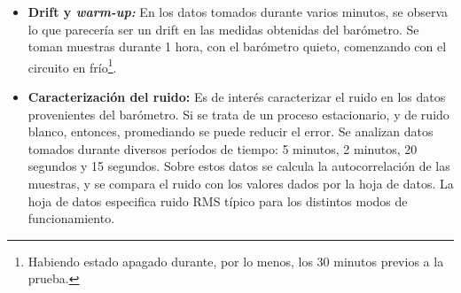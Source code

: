\documentclass[main]{subfiles}
\begin{document}
\begin{itemize}
\item \label{sec:drift-y-warm-up} \textbf{Drift y \textit{warm-up:}} En los datos tomados durante varios minutos, se observa lo que parecer\'ia ser un drift en las medidas obtenidas del bar\'ometro. Se toman muestras durante 1 hora, con el bar\'ometro quieto, comenzando con el circuito en fr\'io\footnote{Habiendo estado apagado durante, por lo menos, los 30 minutos previos a la prueba.}.

\item \textbf{Caracterizaci\'on del ruido:} Es de inter\'es caracterizar el ruido en los datos provenientes del bar\'ometro. Si se trata de un proceso estacionario, y de ruido blanco, entonces, promediando se puede reducir el error. Se analizan datos tomados durante diversos per\'iodos de tiempo: 5 minutos, 2 minutos, 20 segundos y 15 segundos. Sobre estos datos se calcula la autocorrelaci\'on de las muestras, y se compara el ruido con los valores dados por la hoja de datos. La hoja de datos especifica ruido RMS t\'ipico para los distintos modos de funcionamiento.

  \begin{figure}[h!]
    \vspace{-20pt}
    \begin{center}
    \end{center}
    \vspace{-20pt}
    \caption{}
    \vspace{-20pt}
    \label{fig:escalera-fing}
  \end{figure}


\end{itemize}
\end{document}
